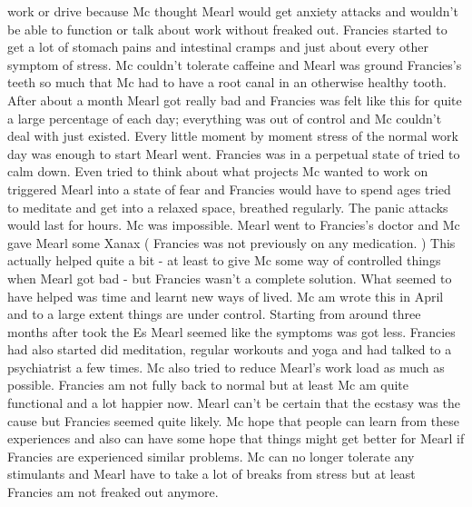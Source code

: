 \documentclass[12pt]{book}
\begin{document}
work or drive because Mc thought Mearl would get anxiety attacks and wouldn't be able to function or talk about work without freaked out. Francies started to get a lot of stomach pains and intestinal cramps and just about every other symptom of stress. Mc couldn't tolerate caffeine and Mearl was ground Francies's teeth so much that Mc had to have a root canal in an otherwise healthy tooth. After about a month Mearl got really bad and Francies was felt like this for quite a large percentage of each day; everything was out of control and Mc couldn't deal with just existed. Every little moment by moment stress of the normal work day was enough to start Mearl went. Francies was in a perpetual state of tried to calm down. Even tried to think about what projects Mc wanted to work on triggered Mearl into a state of fear and Francies would have to spend ages tried to meditate and get into a relaxed space, breathed regularly. The panic attacks would last for hours. Mc was impossible. Mearl went to Francies's doctor and Mc gave Mearl some Xanax ( Francies was not previously on any medication. ) This actually helped quite a bit - at least to give Mc some way of controlled things when Mearl got bad - but Francies wasn't a complete solution. What seemed to have helped was time and learnt new ways of lived. Mc am wrote this in April and to a large extent things are under control. Starting from around three months after took the Es Mearl seemed like the symptoms was got less. Francies had also started did meditation, regular workouts and yoga and had talked to a psychiatrist a few times. Mc also tried to reduce Mearl's work load as much as possible. Francies am not fully back to normal but at least Mc am quite functional and a lot happier now. Mearl can't be certain that the ecstasy was the cause but Francies seemed quite likely. Mc hope that people can learn from these experiences and also can have some hope that things might get better for Mearl if Francies are experienced similar problems. Mc can no longer tolerate any stimulants and Mearl have to take a lot of breaks from stress but at least Francies am not freaked out anymore.
\end{document}
